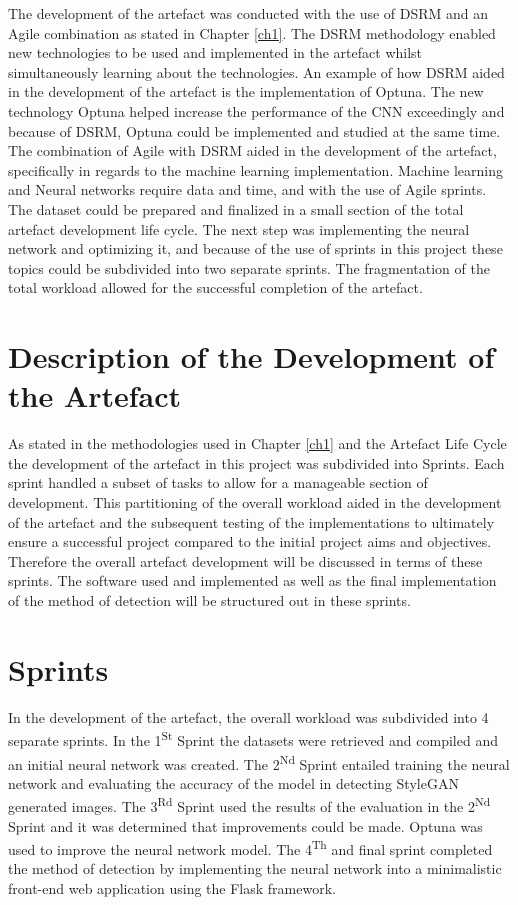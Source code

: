 The development of the artefact was conducted with the use of DSRM and an Agile combination as stated in  Chapter \ref{ch1}. The DSRM  methodology enabled new technologies to be used and implemented in the artefact whilst simultaneously learning about the technologies. An example of how DSRM aided in the development of the artefact is the implementation of Optuna. The new technology Optuna helped increase the performance of the CNN exceedingly and because of DSRM, Optuna could be implemented and studied at the same time. The combination of Agile with DSRM aided in the development of the artefact, specifically in regards to the machine learning implementation. Machine learning and Neural networks require data and time, and with the use of Agile sprints. The dataset could be prepared and finalized in a small section of the total artefact development life cycle. The next step was implementing the neural network and optimizing it, and because of the use of sprints in this project these topics could be subdivided into two separate sprints. The fragmentation of the total workload allowed for the successful completion of the artefact.

\section{Description of the Development of the Artefact}

As stated in the methodologies used in Chapter \ref{ch1} and the Artefact Life Cycle the development of the artefact in this project was subdivided into Sprints. Each sprint handled a subset of tasks to allow for a manageable section of development. This partitioning of the overall workload aided in the development of the artefact and the subsequent testing of the implementations to ultimately ensure a successful project compared to the initial project aims and objectives. Therefore the overall artefact development will be discussed in terms of these sprints. The software used and implemented as well as the final implementation of the method of detection will be structured out in these sprints. 

\section{Sprints}

In the development of the artefact, the overall workload was subdivided into 4 separate sprints. In the 1\textsuperscript{St} Sprint the datasets were retrieved and compiled and an initial neural network was created. The 2\textsuperscript{Nd} Sprint entailed training the neural network and evaluating the accuracy of the model in detecting StyleGAN generated images. The 3\textsuperscript{Rd} Sprint used the results of the evaluation in the 2\textsuperscript{Nd} Sprint and it was determined that improvements could be made. Optuna was used to improve the neural network model. The 4\textsuperscript{Th} and final sprint completed the method of detection by implementing the neural network into a minimalistic front-end web application using the Flask framework.

